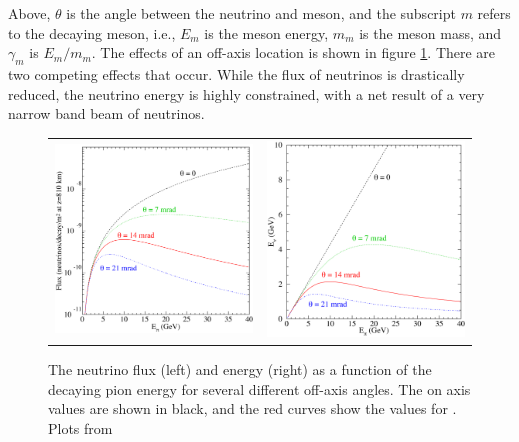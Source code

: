 \n Above, $\theta$ is the angle between the neutrino and meson, and the subscript $m$ refers to the decaying meson, i.e., $E_m$ is the meson energy, $m_m$ is the meson mass, and $\gamma_m$ is $E_m / m_m$. The effects of an off-axis location is shown in figure \ref{fig:OffAxis}. There are two competing effects that occur. While the flux of neutrinos is drastically reduced, the neutrino energy is highly constrained, with a net result of a very narrow band beam of neutrinos.
\begin{figure}[htb]
  \centering
  \begin{tabular}{c c}
    \includegraphics[width=.47\textwidth]{figures/OffAxisFlux.png} &
    \includegraphics[width=.47\textwidth]{figures/OffAxisE.png} \\
  \end{tabular}
  \caption[Off-Axis Flux and Energy]{The neutrino flux (left) and energy (right) as a function of the decaying pion energy for several different off-axis angles. The on axis values are shown in black, and the red curves show the values for \nova. Plots from \cite{ref:TDRNOvA}}
  \label{fig:OffAxis}
\end{figure}

